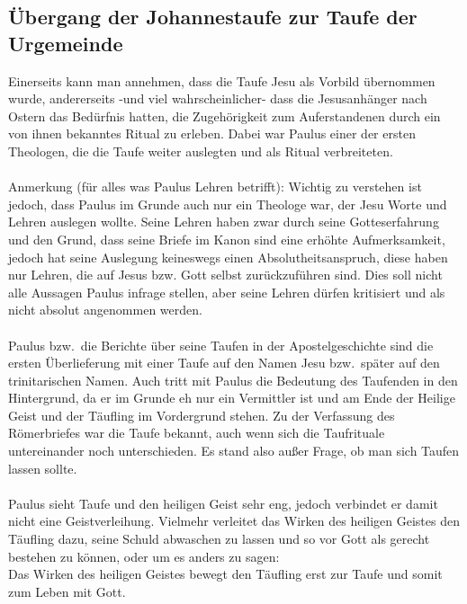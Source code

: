 \subsection{Übergang der Johannestaufe zur Taufe der Urgemeinde}
Einerseits kann man annehmen, dass die Taufe Jesu als Vorbild übernommen wurde, andererseits -und viel wahrscheinlicher- dass die Jesusanhänger nach Ostern das Bedürfnis hatten, die Zugehörigkeit zum Auferstandenen durch ein von ihnen bekanntes Ritual zu erleben. Dabei war Paulus einer der ersten Theologen, die die Taufe weiter auslegten und als Ritual verbreiteten.
\\~\\
Anmerkung (für alles was Paulus Lehren betrifft): Wichtig zu verstehen ist jedoch, dass Paulus im Grunde auch nur ein Theologe war, der Jesu Worte und Lehren auslegen wollte. Seine Lehren haben zwar durch seine Gotteserfahrung und den Grund, dass seine Briefe im Kanon sind eine erhöhte Aufmerksamkeit, jedoch hat seine Auslegung keineswegs einen Absolutheitsanspruch, diese haben nur Lehren, die auf Jesus bzw. Gott selbst zurückzuführen sind. Dies soll nicht alle Aussagen Paulus infrage stellen, aber seine Lehren dürfen kritisiert und als nicht absolut angenommen werden.
\\~\\
Paulus bzw.\ die Berichte über seine Taufen in der Apostelgeschichte sind die ersten Überlieferung mit einer Taufe auf den Namen Jesu bzw.\ später auf den trinitarischen Namen. Auch tritt mit Paulus die Bedeutung des Taufenden in den Hintergrund, da er im Grunde eh nur ein Vermittler ist und am Ende der Heilige Geist und der Täufling im Vordergrund stehen. Zu der Verfassung des Römerbriefes war die Taufe bekannt, auch wenn sich die Taufrituale untereinander noch unterschieden. Es stand also außer Frage, ob man sich Taufen lassen sollte.
\\~\\
Paulus sieht Taufe und den heiligen Geist sehr eng, jedoch verbindet er damit nicht eine Geistverleihung. Vielmehr verleitet das Wirken des heiligen Geistes den Täufling dazu, seine Schuld abwaschen zu lassen und so vor Gott als gerecht bestehen zu können, oder um es anders zu sagen:
\\
Das Wirken des heiligen Geistes bewegt den Täufling erst zur Taufe und somit zum Leben mit Gott.

